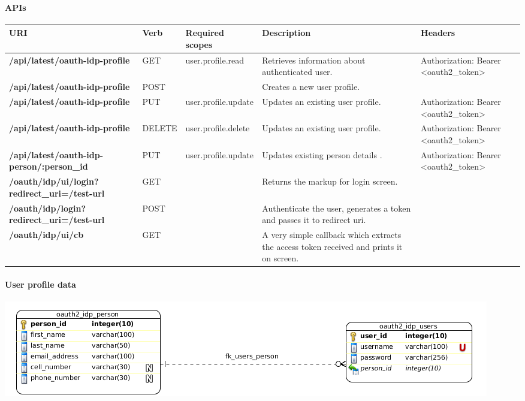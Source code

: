 \documentclass[letterpaper,10pt,english]{sphinxmanual}
\begin{document}
\paragraph{APIs}
\label{features/oauth2/idp:apis}
\begin{tabulary}{\linewidth}{|L|L|L|L|L|}
\hline

\textbf{URI}
 & 
\textbf{Verb}
 & 
\textbf{Required scopes}
 & 
\textbf{Description}
 & 
\textbf{Headers}
\\\hline

\textbf{/api/latest/oauth-idp-profile}
 & 
GET
 & 
user.profile.read
 & 
Retrieves information about authenticated user.
 & 
Authorization: Bearer \textless{}oauth2\_token\textgreater{}
\\\hline

\textbf{/api/latest/oauth-idp-profile}
 & 
POST
 &  & 
Creates a new user profile.
 & \\\hline

\textbf{/api/latest/oauth-idp-profile}
 & 
PUT
 & 
user.profile.update
 & 
Updates an existing user profile.
 & 
Authorization: Bearer \textless{}oauth2\_token\textgreater{}
\\\hline

\textbf{/api/latest/oauth-idp-profile}
 & 
DELETE
 & 
user.profile.delete
 & 
Updates an existing user profile.
 & 
Authorization: Bearer \textless{}oauth2\_token\textgreater{}
\\\hline

\textbf{/api/latest/oauth-idp-person/:person\_id}
 & 
PUT
 & 
user.profile.update
 & 
Updates existing person details .
 & 
Authorization: Bearer \textless{}oauth2\_token\textgreater{}
\\\hline

\textbf{/oauth/idp/ui/login?redirect\_uri=/test-url}
 & 
GET
 &  & 
Returns the markup for login screen.
 & \\\hline

\textbf{/oauth/idp/login?redirect\_uri=/test-url}
 & 
POST
 &  & 
Authenticate the user, generates a token and passes it to redirect uri.
 & \\\hline

\textbf{/oauth/idp/ui/cb}
 & 
GET
 &  & 
A very simple callback which extracts the access token received and prints it on screen.
 & \\\hline
\end{tabulary}



\paragraph{User profile data}
\label{features/oauth2/idp:user-profile-data}
\includegraphics{idp_profiles.png}
\end{document}

